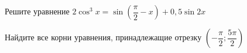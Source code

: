 \begin{ex}
	\begin{condition}
		\begin{enumcols}[label=\asbuk*)]
			\item Решите уравнение \( 2\cos^3 x = \sin{\left(\dfrac{\pi}{2}- x\right)}+0,5\sin 2x \)
			\item Найдите все корни уравнения, принадлежащие отрезку \( \left(-\dfrac{\pi}{2};\dfrac{5\pi}{2}\right) \)
		\end{enumcols}
	\end{condition}
\end{ex}